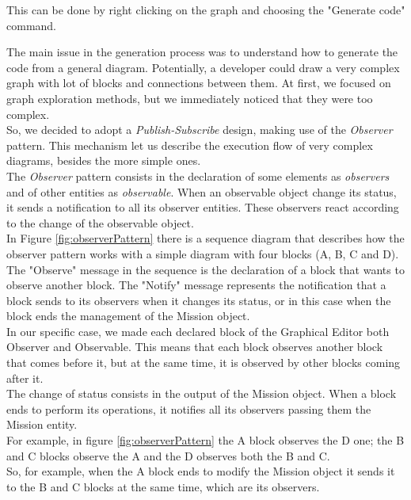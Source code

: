 This can be done by right clicking on the graph and choosing the "Generate code" command.

The main issue in the generation process was to understand how to generate the code from a general diagram. 
Potentially, a developer could draw a very complex graph with lot of blocks and connections between them.
At first, we focused on graph exploration methods, but we immediately noticed that they were too complex.
\\

So, we decided to adopt a \textit{Publish-Subscribe} design, making use of the \textit{Observer} pattern. This mechanism let us describe the execution flow of very complex diagrams, besides the more simple ones.
\\
 
The \textit{Observer} pattern consists in the declaration of some elements as \textit{observers} and of other entities as \textit{observable}. 
When an observable object change its status, it sends a notification to all its observer entities. 
These observers react according to the change of the observable object.
\\

In Figure \ref{fig:observerPattern} there is a sequence diagram that describes how the observer pattern works with a simple diagram with four blocks (A, B, C and D).
\\
The "Observe" message in the sequence is the declaration of a block that wants to observe another block. The "Notify" message represents the notification that a block sends to its observers when it changes its status, or in this case when the block ends the management of the Mission object.
\\


In our specific case, we made each declared block of the Graphical Editor both Observer and Observable. 
This means that each block observes another block that comes before it, but at the same time, it is observed by other blocks coming after it.
\\
The change of status consists in the output of the Mission object.
When a block ends to perform its operations, it notifies all its observers passing them the Mission entity.
\\
For example, in figure \ref{fig:observerPattern} the A block observes the D one; the B and C blocks observe the A and the D observes both the B and C.
\\
So, for example, when the A block ends to modify the Mission object it sends it to the B and C blocks at the same time, which are its observers.
\\

